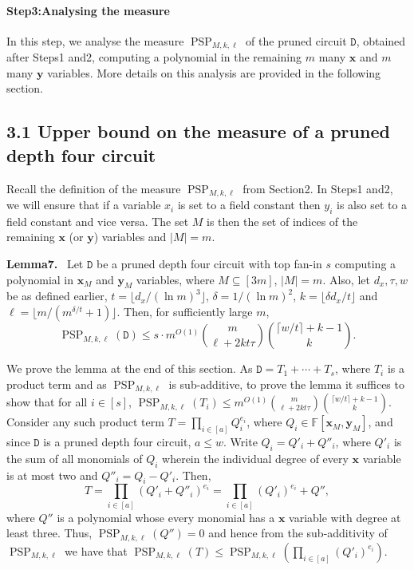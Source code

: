 \documentclass[10pt,a4paper]{article}
\newenvironment{authorclaim}[1]{\par\medskip\noindent\textbf{#1.}\ \ignorespaces}{\par\medskip}
\DeclareMathOperator{\PSP}{PSP}
\begin{document}
\paragraph{Step3:Analysing the measure}
In this step, we analyse the measure $\PSP_{M,k,\ell}$ of the pruned circuit $\mathtt D$, obtained after Steps1 and2, computing a polynomial in the remaining $m$ many $\mathbf x$ and $m$ many $\mathbf y$ variables. More details on this analysis are provided in the following section.
\subsection*{3.1 Upper bound on the measure of a pruned depth four circuit}
Recall the definition of the measure $\PSP_{M,k,\ell}$ from Section2. In Steps1 and2, we will ensure that if a variable $x_i$ is set to a field constant then $y_i$ is also set to a field constant and vice versa. The set $M$ is then the set of indices of the remaining $\mathbf x$ (or $\mathbf y$) variables and $|M|=m$.
\begin{authorclaim}{Lemma7}
Let $\mathtt D$ be a pruned depth four circuit with top fan-in $s$ computing a polynomial in $\mathbf x_M$ and $\mathbf y_M$ variables, where $M\subseteq[3m]$, $|M|=m$. Also, let $d_x,\tau,w$ be as defined earlier, $t=\lfloor d_x/(\ln m)^3\rfloor$, $\delta=1/(\ln m)^2$, $k=\lfloor\delta d_x/t\rfloor$ and $\ell=\lfloor m/(m^{\delta/t}+1)\rfloor$. Then, for sufficiently large $m$,
\[
\PSP_{M,k,\ell}(\mathtt D)\le s\cdot m^{O(1)}\binom m{\ell+2kt\tau}\binom{\lceil w/t\rceil+k-1}{k}.
\]
\end{authorclaim}
We prove the lemma at the end of this section. As $\mathtt D=T_1+\cdots+T_s$, where $T_i$ is a product term and as $\PSP_{M,k,\ell}$ is sub-additive, to prove the lemma it suffices to show that for all $i\in[s]$,
$\PSP_{M,k,\ell}(T_i)\le m^{O(1)}\binom m{\ell+2kt\tau}\binom{\lceil w/t\rceil+k-1}{k}$.
Consider any such product term $T=\prod_{i\in[a]}Q_i^{e_i}$, where $Q_i\in\mathbb F[\mathbf x_M,\mathbf y_M]$, and since $\mathtt D$ is a pruned depth four circuit, $a\le w$. Write $Q_i=Q'_i+Q''_i$, where $Q'_i$ is the sum of all monomials of $Q_i$ wherein the individual degree of every $\mathbf x$ variable is at most two and $Q''_i=Q_i-Q'_i$. Then,
\[
T=\prod_{i\in[a]}(Q'_i+Q''_i)^{e_i}=\prod_{i\in[a]}(Q'_i)^{e_i}+Q'',
\]
where $Q''$ is a polynomial whose every monomial has a $\mathbf x$ variable with degree at least three. Thus, $\PSP_{M,k,\ell}(Q'')=0$ and hence from the sub-additivity of $\PSP_{M,k,\ell}$ we have that
$\PSP_{M,k,\ell}(T)\le\PSP_{M,k,\ell}(\prod_{i\in[a]}(Q'_i)^{e_i})$.
\end{document}
